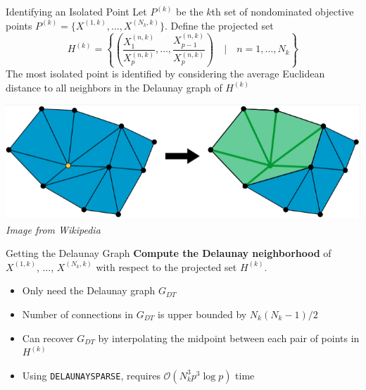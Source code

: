 \documentclass[xcolor=dvipsnames]{beamer}
\begin{document}
\begin{frame}{Identifying an Isolated Point}
Let $P^{(k)}$ be the $k$th set of nondominated objective points
$P^{(k)} = \{X^{(1,k)}, \ldots, X^{(N_k,k)}\} $.
\medskip
Define the projected set 
$$
H^{(k)} = \left\{ \left(\frac{X^{(n,k)}_1}{X^{(n,k)}_p}, \ldots,
\frac{X^{(n,k)}_{p-1}}{X^{(n,k)}_p}\right) \quad\bigg|\quad
n = 1, \ldots, N_k\right\}
$$
The most isolated point is identified by considering the average
Euclidean distance to all neighbors in the Delaunay graph of $H^{(k)}$\\
\begin{center}
\includegraphics[width=.5\textwidth]{del-nbhd.png}\\
{\it Image from Wikipedia}
\end{center}
\end{frame}
\begin{frame}{Getting the Delaunay Graph}
\textbf{Compute the Delaunay neighborhood} of $X^{(1,k)}$, $\ldots$,
$X^{(N_k,k)}$ with respect to the projected set $H^{(k)}$.\\
\medskip
\begin{itemize}
\item Only need the Delaunay graph $G_{DT}$
\item Number of connections in $G_{DT}$ is upper bounded by $N_k(N_k-1)/2$
\item Can recover $G_{DT}$ by interpolating the midpoint between each pair
of points in $H^{(k)}$
\item Using {\tt DELAUNAYSPARSE}, requires
$\mathcal{O}(N_k^3 p^3 \log p)$ time
\end{itemize}
\end{frame}
\end{document}
